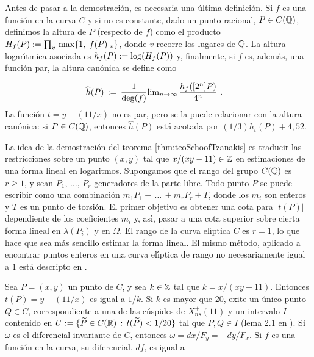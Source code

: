 Antes de pasar a la demostraci\'{o}n, es necesaria una \'{u}ltima
definici\'{o}n. Si $f$ es una funci\'{o}n en la curva $C$ y si no es
constante, dado un punto racional, $P\in C(\bb{Q})$, definimos la
altura de $P$ (respecto de $f$) como el producto
$H_{f}(P):=\prod_{v}\,\rm{max}\{1,|f(P)|_{v}\}$, donde $v$ recorre
los lugares de $\bb{Q}$. La altura logar\'{\i}tmica asociada es
$h_{f}(P):=\rm{log}(H_{f}(P))$ y, finalmente, si $f$ es, adem\'{a}s,
una funci\'{o}n par, la altura can\'{o}nica se define como

\begin{align*}
\widehat{h}(P) & \,:=\,\frac{1}{\rm{deg}(f)}
\rm{lim}_{n\rightarrow\infty}\,\frac{h_{f}([2^{n}]P)}{4^{n}}\text{ .}
\end{align*}
La funci\'{o}n $t=y-(11/x)$ no es par, pero se la puede relacionar con
la altura can\'{o}nica: si $P\in C(\bb{Q})$, entonces
$\widehat{h}(P)$ est\'{a} acotada por $(1/3)h_{t}(P)+4,52$.

La idea de la demostraci\'{o}n del teorema \ref{thm:teoSchoofTzanakis} es
traducir las restricciones sobre un punto $(x,y)$ tal que
$x/(xy-11)\in\bb{Z}$ en estimaciones de una forma lineal en logaritmos.
Supongamos que el rango del grupo $C(\bb{Q})$ es $r\geq 1$, y sean
$P_{1},\,\dots,\,P_{r}$ generadores de la parte libre. Todo punto $P$
se puede escribir como una combinaci\'{o}n
$m_{1}P_{1}+\,\dots\,+m_{r}P_{r}+T$, donde los $m_{i}$ son enteros y $T$ es
un punto de torsi\'{o}n.
El primer objetivo es obtener una cota para $|t(P)|$
dependiente de los coeficientes $m_{i}$ y, as\'{\i}, pasar a
una cota superior sobre cierta forma lineal en $\lambda(P_{i})$ y en $\Omega$.
El rango de la curva el\'{\i}ptica $C$ es $r=1$, lo
que hace que sea m\'{a}s sencillo estimar la forma lineal. El mismo m\'{e}todo,
aplicado a encontrar puntos enteros en una curva el\'{\i}ptica de rango no
necesariamente igual a $1$ est\'{a} descripto en \cite{stroekerTzanakis}.

Sea $P=(x,y)$ un punto de $C$, y sea $k\in\bb{Z}$ tal que
$k=x/(xy-11)$. Entonces $t(P)=y-(11/x)$ es igual a $1/k$. Si $k$ es
mayor que $20$, exite un \'{u}nico punto $Q\in C$, correspondiente a
una de las c\'{u}spides de $X_{ns}^{+}(11)$ y un intervalo $I$ contenido
en $U:=\{\widetilde{P}\in C(\bb{R})\,:\,t(\widetilde{P})<1/20\}$
tal que $P,Q\in I$ (lema 2.1 en \cite{schoofTzanakisLevelEleven}). Si $\omega$ es el
diferencial invariante de $C$, entonces $\omega=dx/F_{y}=-dy/F_{x}$.
Si $f$ es una funci\'{o}n en la curva, su diferencial, $df$, es igual a

